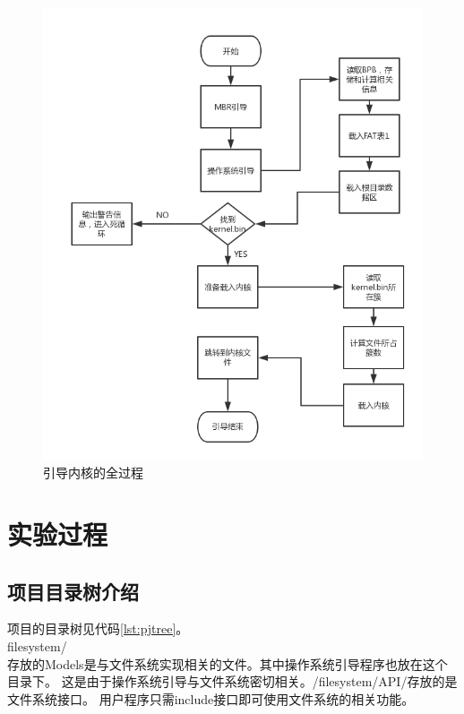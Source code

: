 \documentclass[a4paper]{article}
\begin{document}
    
    \begin{figure}
        \begin{center}
        \includegraphics[scale=0.6]{asset/loading.png}
        \caption{引导内核的全过程\label{fig:loading}} 
        \end{center} 
    \end{figure} 
    
\section{实验过程}
    \subsection{项目目录树介绍}\label{sec:pjtree}
    项目的目录树见代码\ref{lst:pjtree}。\\
    
    filesystem/\\
    存放的Models是与文件系统实现相关的文件。其中操作系统引导程序也放在这个目录下。
    这是由于操作系统引导与文件系统密切相关。/filesystem/API/存放的是文件系统接口。
    用户程序只需include接口即可使用文件系统的相关功能。\\
    
\end{document}
